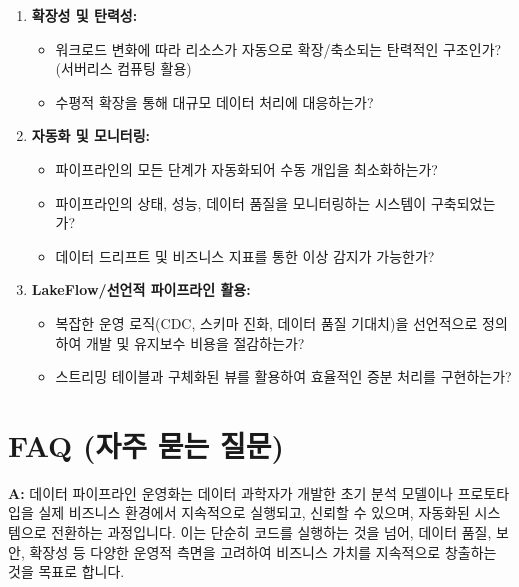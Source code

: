 \documentclass[11pt,a4paper]{article}
\begin{document}
\begin{enumerate}
\begin{enumerate}
\begin{itemize}
        \item 데이터 계보(Lineage) 추적이 가능한가?
        \item 데이터 카탈로그를 통해 데이터 발견 가능성이 확보되었는가?
    \end{itemize}
    \item \textbf{확장성 및 탄력성:}
    \begin{itemize}
        \item 워크로드 변화에 따라 리소스가 자동으로 확장/축소되는 탄력적인 구조인가? (서버리스 컴퓨팅 활용)
        \item 수평적 확장을 통해 대규모 데이터 처리에 대응하는가?
    \end{itemize}
    \item \textbf{자동화 및 모니터링:}
    \begin{itemize}
        \item 파이프라인의 모든 단계가 자동화되어 수동 개입을 최소화하는가?
        \item 파이프라인의 상태, 성능, 데이터 품질을 모니터링하는 시스템이 구축되었는가?
        \item 데이터 드리프트 및 비즈니스 지표를 통한 이상 감지가 가능한가?
    \end{itemize}
    \item \textbf{LakeFlow/선언적 파이프라인 활용:}
    \begin{itemize}
        \item 복잡한 운영 로직(CDC, 스키마 진화, 데이터 품질 기대치)을 선언적으로 정의하여 개발 및 유지보수 비용을 절감하는가?
        \item 스트리밍 테이블과 구체화된 뷰를 활용하여 효율적인 증분 처리를 구현하는가?
    \end{itemize}
\end{enumerate}

\newpage
\section*{\centering FAQ (자주 묻는 질문)}

\begin{tcolorbox}[conceptbox, title={Q: 데이터 파이프라인 운영화가 정확히 무엇인가요?}]
\textbf{A:} 데이터 파이프라인 운영화는 데이터 과학자가 개발한 초기 분석 모델이나 프로토타입을 실제 비즈니스 환경에서 지속적으로 실행되고, 신뢰할 수 있으며, 자동화된 시스템으로 전환하는 과정입니다. 이는 단순히 코드를 실행하는 것을 넘어, 데이터 품질, 보안, 확장성 등 다양한 운영적 측면을 고려하여 비즈니스 가치를 지속적으로 창출하는 것을 목표로 합니다.
\end{tcolorbox}


\end{enumerate}
\end{document}
